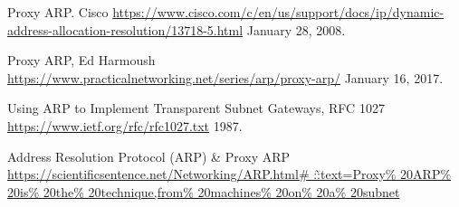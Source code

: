 \begin{thebibliography}{9}
Proxy ARP. Cisco \href{https://www.cisco.com/c/en/us/support/docs/ip/dynamic-address-allocation-resolution/13718-5.html}{https://www.cisco.com/c/en/us/support/docs/ip/dynamic-address-allocation-resolution/13718-5.html} January 28, 2008.

Proxy ARP,  Ed Harmoush \href{https://www.practicalnetworking.net/series/arp/proxy-arp/}{https://www.practicalnetworking.net/series/arp/proxy-arp/} January 16, 2017.

Using ARP to Implement Transparent Subnet Gateways, RFC 1027
 \href{https://www.ietf.org/rfc/rfc1027.txt}{https://www.ietf.org/rfc/rfc1027.txt} 1987.

Address Resolution Protocol (ARP) \& Proxy ARP
 \href{https://scientificsentence.net/Networking/ARP.html\# :\~:text=Proxy\% 20ARP\% 20is\% 20the\% 20technique,from\% 20machines\% 20on\% 20a\% 20subnet}{https://scientificsentence.net/Networking/ARP.html\# :\~:text=Proxy\% 20ARP\% 20is\% 20the\% 20technique,from\% 20machines\% 20on\% 20a\% 20subnet}

\end{thebibliography}
